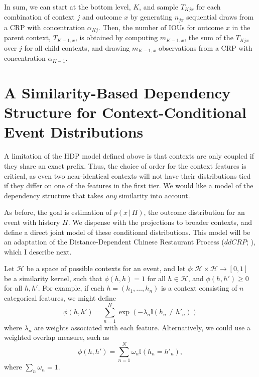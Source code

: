 \documentclass[12pt,letterpaper]{report}
\newcommand{\given}{\, \vert \,}
\begin{document}
In sum, we can start at the bottom level, $K$, and sample $T_{Kjx}$ for each
combination of context $j$ and outcome $x$ by generating 
$n_{jx}$ sequential draws from a CRP with concentration
$\alpha_{Kj}$.  Then, the number of IOUs for outcome $x$ in the parent context,
$T_{K-1,x}$, is obtained by computing $m_{K-1,x}$, the sum of the
$T_{Kjx}$ over $j$ for all child contexts, and drawing $m_{K-1,x}$
observations from a CRP with concentration $\alpha_{K-1}$.

\section{A Similarity-Based Dependency Structure for Context-Conditional Event Distributions}

A limitation of the HDP model defined above is that contexts are only
coupled if they share an exact prefix.  Thus, the choice of order for
the context features is critical, as even two near-identical contexts
will not have their distributions tied if they differ on one of the
features in the first tier.  We would like a model of the dependency
structure that takes {\em any} similarity into account.

As before, the goal is estimation of $p(x \given H)$, the outcome
distribution for an event with history $H$.  We dispense with the
projections to broader contexts, and define a direct joint model of these
conditional distributions.  This model will be an adaptation of the
Distance-Dependent Chinese Restaurant Process ($ddCRP$;
\citet{blei2011distance}), which I describe next.

Let $\mathcal{H}$ be a space of possible contexts for an event, and
let $\phi: \mathcal{H} \times \mathcal{H} \to [0,1]$ be a similarity
kernel, such that $\phi(h,h) = 1$ for all $h \in \mathcal{H}$, and
$\phi(h,h') \geq 0$ for all $h,h'$.  For example, if each $h = (h_{1},
\dots, h_{n})$ is a context consisting of $n$ categorical features,
we might define
\begin{equation}
  \label{eq:exponential-similarity}
  \phi(h,h') = \sum_{n=1}^N \exp(-\lambda_n \mathbb{I}(h_n \neq h'_n))
\end{equation}
where $\lambda_n$ are weights associated with each feature.
Alternatively, we could use a weighted overlap measure, such as
\begin{equation}
  \label{eq:weighted-similarity}
  \phi(h,h') = \sum_{n=1}^N \omega_n \mathbb{I}(h_n = h'_n),
\end{equation}
where $\sum_{n} \omega_n = 1$.
\end{document}
